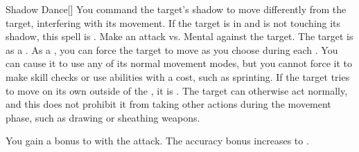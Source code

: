 \lowercase{\hypertarget{spell:Shadow Dance}{}}\label{spell:Shadow Dance}
\begin{freeability}[Rank 3]{\hypertarget{spell:Shadow Dance}{Shadow Dance}}[]
You command the target's shadow to move differently from the target, interfering with its movement.
If the target is in  and is not touching its shadow, this spell is .
Make an attack vs. Mental against the target.
\hit The target is  as a .
\crit As a , you can force the target to move as you choose during each .
You can cause it to use any of its normal movement modes, but you cannot force it to make skill checks or use abilities with a cost, such as sprinting.
If the target tries to move on its own outside of the , it is .
The target can otherwise act normally, and this does not prohibit it from taking other actions during the movement phase, such as drawing or sheathing weapons.

\rankline
{} You gain a  bonus to  with the attack.
 The accuracy bonus increases to .
\end{freeability}
\vspace{0.25em}



